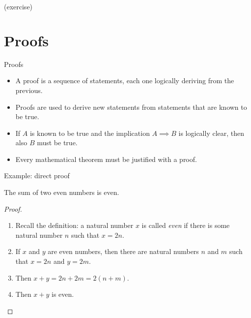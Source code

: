 \documentclass[11pt]{beamer}
\theoremstyle{definition}
\begin{document}
\begin{frame}
  (exercise)
\end{frame}

\section{Proofs}

\begin{frame}{Proofs}
  \begin{itemize}
    \item A proof is a sequence of statements, each one logically deriving from
          the previous.
          \pause
    \item Proofs are used to derive new statements from statements that are
          known to be true.
          \pause
    \item If $A$ is known to be true and the implication $A\implies B$ is
          logically clear, then also $B$ must be true.
          \pause
    \item Every mathematical theorem must be justified with a proof.
  \end{itemize}
\end{frame}

\begin{frame}{Example: direct proof}
  \begin{theorem}
    The sum of two even numbers is even.
  \end{theorem}
  \pause
  \begin{proof}
    \begin{enumerate}
  \item Recall the definition: a natural number $x$ is called \emph{even}
        if there is some natural number $n$ such that $x=2n$.
    \pause
  \item If $x$ and $y$ are even numbers, then there are natural numbers $n$
    and $m$ such that $x=2n$ and $y=2m$.
    \pause
  \item Then $x+y=2n+2m=2(n+m)$.
    \pause
  \item Then $x+y$ is even.
    \end{enumerate} 
  \end{proof}
\end{frame}


\end{document}
